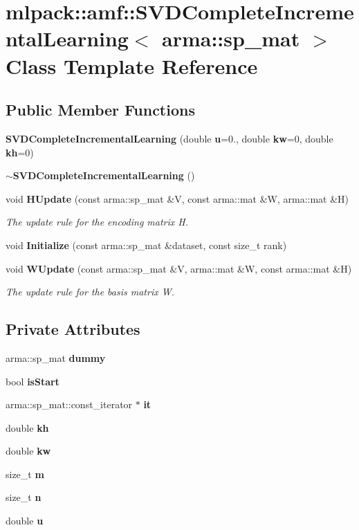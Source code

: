 \section{mlpack\-:\-:amf\-:\-:S\-V\-D\-Complete\-Incremental\-Learning$<$ arma\-:\-:sp\-\_\-mat $>$ Class Template Reference}
\label{classmlpack_1_1amf_1_1SVDCompleteIncrementalLearning_3_01arma_1_1sp__mat_01_4}
\subsection*{Public Member Functions}
\begin{DoxyCompactItemize}
\item 
{\bf S\-V\-D\-Complete\-Incremental\-Learning} (double {\bf u}=0., double {\bf kw}=0, double {\bf kh}=0)
\item 
{\bf $\sim$\-S\-V\-D\-Complete\-Incremental\-Learning} ()
\item 
void {\bf H\-Update} (const arma\-::sp\-\_\-mat \&V, const arma\-::mat \&W, arma\-::mat \&H)
\begin{DoxyCompactList}\small\item\em The update rule for the encoding matrix H. \end{DoxyCompactList}\item 
void {\bf Initialize} (const arma\-::sp\-\_\-mat \&dataset, const size\-\_\-t rank)
\item 
void {\bf W\-Update} (const arma\-::sp\-\_\-mat \&V, arma\-::mat \&W, const arma\-::mat \&H)
\begin{DoxyCompactList}\small\item\em The update rule for the basis matrix W. \end{DoxyCompactList}\end{DoxyCompactItemize}
\subsection*{Private Attributes}
\begin{DoxyCompactItemize}
\item 
arma\-::sp\-\_\-mat {\bf dummy}
\item 
bool {\bf is\-Start}
\item 
arma\-::sp\-\_\-mat\-::const\-\_\-iterator $\ast$ {\bf it}
\item 
double {\bf kh}
\item 
double {\bf kw}
\item 
size\-\_\-t {\bf m}
\item 
size\-\_\-t {\bf n}
\item 
double {\bf u}
\end{DoxyCompactItemize}


